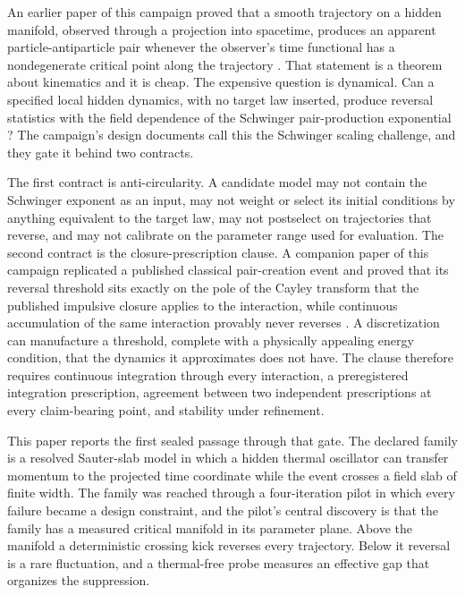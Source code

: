 \documentclass[aps,prd,reprint,nofootinbib,longbibliography]{revtex4-2}
\begin{document}
An earlier paper of this campaign proved that a smooth trajectory on a
hidden manifold, observed through a projection into spacetime, produces an
apparent particle-antiparticle pair whenever the observer's time functional
has a nondegenerate critical point along the trajectory \cite{ZenodoEntropy}.
That statement is a theorem about kinematics and it is cheap.  The
expensive question is dynamical.  Can a specified local hidden dynamics,
with no target law inserted, produce reversal statistics with the field
dependence of the Schwinger pair-production exponential
\cite{Sauter1931, HeisenbergEuler1936, Schwinger1951, Dunne2004}?  The
campaign's design documents call this the Schwinger scaling challenge, and
they gate it behind two contracts.

The first contract is anti-circularity.  A candidate model may not contain
the Schwinger exponent as an input, may not weight or select its initial
conditions by anything equivalent to the target law, may not postselect on
trajectories that reverse, and may not calibrate on the parameter range
used for evaluation.  The second contract is the closure-prescription
clause.  A companion paper of this campaign replicated a published
classical pair-creation event \cite{Land2016} and proved that its reversal
threshold sits exactly on the pole of the Cayley transform that the
published impulsive closure applies to the interaction, while continuous
accumulation of the same interaction provably never reverses
\cite{ZenodoCayley}.  A discretization can manufacture a threshold,
complete with a physically appealing energy condition, that the dynamics
it approximates does not have.  The clause therefore requires continuous
integration through every interaction, a preregistered integration
prescription, agreement between two independent prescriptions at every
claim-bearing point, and stability under refinement.

This paper reports the first sealed passage through that gate.  The
declared family is a resolved Sauter-slab model in which a hidden thermal
oscillator can transfer momentum to the projected time coordinate while
the event crosses a field slab of finite width.  The family was reached
through a four-iteration pilot in which every failure became a design
constraint, and the pilot's central discovery is that the family has a
measured critical manifold in its parameter plane.  Above the manifold a
deterministic crossing kick reverses every trajectory.  Below it reversal
is a rare fluctuation, and a thermal-free probe measures an effective gap
that organizes the suppression.
\end{document}
